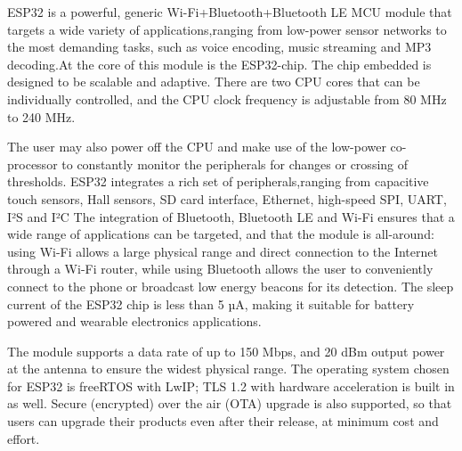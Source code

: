 \documentclass[a4paper]{report}
\begin{document}
{ESP32 is a powerful, generic Wi-Fi+Bluetooth+Bluetooth LE MCU module that targets a wide variety of applications,ranging from low-power sensor networks to the most demanding tasks, such as voice encoding, music streaming and MP3 decoding.At the core of this module is the ESP32-chip. The chip embedded is designed to be scalable and adaptive. There are two CPU cores that can be individually controlled, and the CPU clock frequency is adjustable from 80 MHz to 240 MHz. 

The user may also power off the CPU and make use of the low-power co-processor to constantly monitor the peripherals for changes or crossing of thresholds. ESP32 integrates a rich set of peripherals,ranging from capacitive touch sensors, Hall sensors, SD card interface, Ethernet, high-speed SPI, UART, I²S and I²C
The integration of Bluetooth, Bluetooth LE and Wi-Fi ensures that a wide range of applications can be targeted, and that the module is all-around: using Wi-Fi allows a large physical range and direct connection to the Internet through a Wi-Fi router, while using Bluetooth allows the user to conveniently connect to the phone or broadcast low energy beacons for its detection. The sleep current of the ESP32 chip is less than 5 µA, making it suitable for battery powered and wearable electronics applications. 

The module supports a data rate of up to 150 Mbps, and 20 dBm output power at the antenna to ensure the widest physical range. The operating system chosen for ESP32 is freeRTOS with LwIP; TLS 1.2 with hardware acceleration is built in as well. Secure (encrypted) over the air (OTA) upgrade is also supported, so that users can upgrade their products even after their release, at minimum cost and effort.

}
\end{document}
